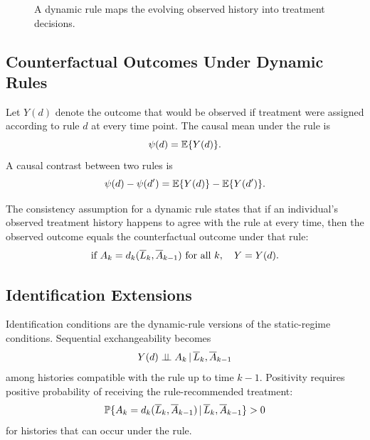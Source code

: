 \begin{figure}[H]
\centering
{}
\caption{A dynamic rule maps the evolving observed history into treatment decisions.}
\label{fig:ch8-dynamic-rule}
\end{figure}

\subsection{Counterfactual Outcomes Under Dynamic Rules}

Let $Y(d)$ denote the outcome that would be observed if treatment were assigned
according to rule $d$ at every time point. The causal mean under the rule is
\[
  \psi(d)=\mathbb{E}\{Y(d)\}.
\]
A causal contrast between two rules is
\[
  \psi(d)-\psi(d')
  =
  \mathbb{E}\{Y(d)\}-\mathbb{E}\{Y(d')\}.
\]

The consistency assumption for a dynamic rule states that if an individual's
observed treatment history happens to agree with the rule at every time, then
the observed outcome equals the counterfactual outcome under that rule:
\[
  \text{if } A_k=d_k(\overline{L}_k,\overline{A}_{k-1})\text{ for all }k,
  \quad Y=Y(d).
\]

\subsection{Identification Extensions}

Identification conditions are the dynamic-rule versions of the static-regime
conditions. Sequential exchangeability becomes
\[
  Y(d) \perp\!\!\!\perp A_k \,\vert\, \overline{L}_k,\overline{A}_{k-1}
\]
among histories compatible with the rule up to time $k-1$. Positivity requires
positive probability of receiving the rule-recommended treatment:
\[
  \mathbb{P}\{A_k=d_k(\overline{L}_k,\overline{A}_{k-1})
  \,\vert\, \overline{L}_k,\overline{A}_{k-1}\}>0
\]
for histories that can occur under the rule.

